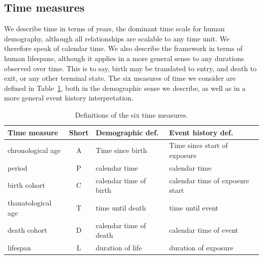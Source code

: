 \documentclass[12pt,oneside,a4paper]{article} %
\begin{document}

\FloatBarrier
\subsection{Time measures}
\FloatBarrier
We describe time in terms of years, the dominant time scale for human
demography, although all relationships are scalable to any time unit. We therefore speak of calendar time. We also describe the framework in terms
of human lifespans, although it applies in a more general sense to any durations
observed over time. This is to say, birth may be translated to entry, and death
to exit, or any other terminal state. The six measures of time we consider are
defined in Table~\ref{tab:sixdefs}, both in the demographic sense we describe, as well as in a more general event history interpretation.

\FloatBarrier
\begin{table}[ht!]
\centering
\caption{Definitions of the six time measures.}
\label{tab:sixdefs}
\begin{adjustwidth}{0em}{0em}
\begin{tabular}{lcll}
\hline 
\textbf{Time measure} & \textbf{Short} & \textbf{Demographic def.} &
\textbf{Event history def.}\\
\hline 
chronological age & A & Time since birth & Time since start of exposure \\
period & P & calendar time & calendar time \\
birth cohort & C & calendar time of birth & calendar time of exposure start \\
thanatological age & T & time until death & time until event \\
death cohort & D & calendar time of death & calendar time of event \\
lifespan & L & duration of life & duration of exposure \\
\end{tabular}
\end{adjustwidth}
\end{table}
\end{document}
